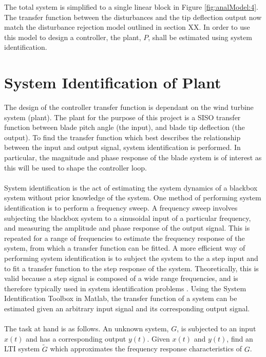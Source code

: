 The total system is simplified to a single linear block in Figure \ref{fig:analModel:4}. The transfer function between the disturbances and the tip deflection output now match the disturbance rejection model outlined in section XX. In order to use this model to design a controller, the plant, $P$, shall be estimated using system identification.

\section{System Identification of Plant}
The design of the controller transfer function is dependant on the wind turbine system (plant). The plant for the purpose of this project is a SISO transfer function between blade pitch angle (the input), and blade tip deflection (the output). To find the transfer function which best describes the relationship between the input and output signal, system identification  is performed. In particular, the magnitude and phase response of the blade system is of interest as this will be used to shape the controller loop. 
\\~\\
System identification is the act of estimating the system dynamics of a blackbox system without prior knowledge of the system. One method of performing system identification is to perform a frequency sweep. A frequency sweep involves subjecting the blackbox system to a sinusoidal input of a particular frequency, and measuring the amplitude and phase response of the output signal. This is repeated for a range of frequencies to estimate the frequency response of the system, from which a transfer function can be fitted. A more efficient way of performing system identification is to subject the system to the a step input and to fit a transfer function to the step response of the system. Theoretically, this is valid because a step signal is composed of a wide range frequencies, and is therefore typically used in system identification problems \citep{19_ljung1998system}. Using the System Identification Toolbox in Matlab, the transfer function of a system can be estimated given an arbitrary input signal and its corresponding output signal.
\\~\\
The task at hand is as follows. An unknown system, $G$, is subjected to an input $x(t)$ and has a corresponding output $y(t)$. Given $x(t)$ and $y(t)$, find an LTI system $\tilde{G}$ which approximates the frequency response characteristics of $G$.
